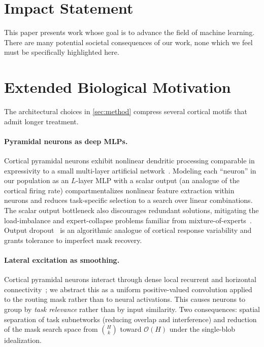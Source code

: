 \documentclass{article}
\theoremstyle{plain}
\theoremstyle{remark}
\begin{document}
\section*{Impact Statement}

This paper presents work whose goal is to advance the field of machine learning. There are many potential societal consequences of our work, none which we feel must be specifically highlighted here.




\newpage
\appendix
\onecolumn

\section{Extended Biological Motivation}
\label{app:bio}
The architectural choices in \cref{sec:method} compress several cortical motifs that admit longer treatment.

\paragraph{Pyramidal neurons as deep MLPs.}
Cortical pyramidal neurons exhibit nonlinear dendritic processing comparable in expressivity to a small multi-layer artificial network~\citep{poirazi2003pyramidal,poirazi2020illuminating,beniaguev2021single}. Modeling each ``neuron'' in our population as an $L$-layer MLP with a scalar output (an analogue of the cortical firing rate) compartmentalizes nonlinear feature extraction within neurons and reduces task-specific selection to a search over linear combinations. The scalar output bottleneck also discourages redundant solutions, mitigating the load-imbalance and expert-collapse problems familiar from mixture-of-experts~\citep{shazeer2017outrageously,fedus2022switch}. Output dropout~\citep{srivastava2014dropout} is an algorithmic analogue of cortical response variability and grants tolerance to imperfect mask recovery.

\paragraph{Lateral excitation as smoothing.}
Cortical pyramidal neurons interact through dense local recurrent and horizontal connectivity~\citep{hubel1962receptive,gilbert1983clustered,douglas2004neuronal}; we abstract this as a uniform positive-valued convolution applied to the routing mask rather than to neural activations. This causes neurons to group by \emph{task relevance} rather than by input similarity. Two consequences: spatial separation of task subnetworks (reducing overlap and interference) and reduction of the mask search space from $\binom{H}{k}$ toward $\mathcal{O}(H)$ under the single-blob idealization.
\end{document}
